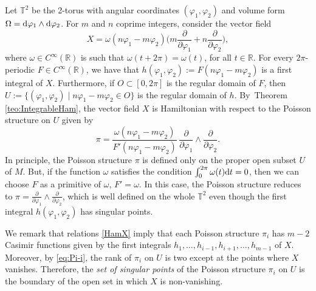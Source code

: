 \documentclass[pdftex]{sigma}%
\newcommand{\dd}{{\rm d}}
\numberwithin{equation}{section}
\begin{document}
\begin{Example}\label{ex:TorusIntegrable}
Let $\mathbb{T}^2$ be the 2-torus with angular coordinates $(\varphi_1,\varphi_2)$ and volume form \mbox{$\Omega= \dd \varphi_1 \wedge \dd \varphi_2$}. For $m$ and $n$ coprime integers, consider the vector field
 \begin{equation*}
 X = \omega(n\varphi_1-m\varphi_2) \bigg( m\frac{\partial}{\partial \varphi_1} + n\frac{\partial}{\partial \varphi_2} \bigg),
 \end{equation*}
where $\omega \in C^\infty(\mathbb{R})$ is such that $\omega(t+2\pi) = \omega(t)$, for all $t\in \mathbb{R}$. For every $2\pi$-periodic $F \in C^\infty(\mathbb{R})$, we have that $h(\varphi_1,\varphi_2):= F(n\varphi_1-m\varphi_2)$ is a first integral of $X$. Furthermore, if $O \subset [0,2\pi]$ is the regular domain of $F$, then $U:=\{(\varphi_1,\varphi_2) \mid n\varphi_1-m\varphi_2\in O\}$ is the regular domain of $h$. By~Theorem \ref{teo:IntegrableHam}, the vector field $X$ is Hamiltonian with respect to the Poisson structure on $U$ given by
 \begin{equation*}
 \pi = \frac{\omega(n\varphi_1-m\varphi_2)}{F'(n\varphi_1-m\varphi_2)}\,\frac{\partial}{\partial \varphi_1}\wedge \frac{\partial}{\partial \varphi_2}.
 \end{equation*}
In principle, the Poisson structure $\pi$ is defined only on the proper open subset $U$ of $M$. But, if the function $\omega$ satisfies the condition $\int_0^{2\pi}\omega(t)\dd t=0$, then we can choose $F$ as a primitive of $\omega$, $F'=\omega$. In this case, the Poisson structure reduces to $\pi = \frac{\partial}{\partial \varphi_1}\wedge \frac{\partial}{\partial \varphi_2}$, which is well defined on the whole $\mathbb{T}^2$ even though the first integral $h(\varphi_1,\varphi_2)$ has singular points.
\end{Example}

We remark that relations \eqref{HamX} imply that each Poisson structure $\pi_i$ has $m-2$ Casimir functions given by the first integrals $h_1,\dots, h_{i-1},h_{i+1},\dots, h_{m-1}$ of $X$. Moreover, by \eqref{eq:Pi-i}, the rank of $\pi_i$ on $U$ is two except at the points where $X$ vanishes. Therefore, the \emph{set of singular points} of the Poisson structure $\pi_i$ on $U$ is the boundary of the open set in which $X$ is non-vanishing.
\end{document}
